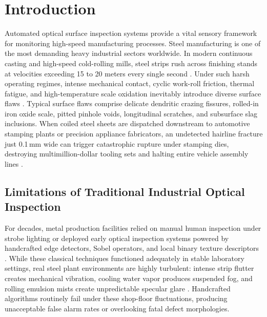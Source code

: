 \documentclass{ieeeaccess}
\begin{document}
\titlepgskip=-15pt

\maketitle

\section{Introduction}
\label{sec:introduction}
Automated optical surface inspection systems provide a vital sensory framework for monitoring high-speed manufacturing processes. Steel manufacturing is one of the most demanding heavy industrial sectors worldwide. In modern continuous casting and high-speed cold-rolling mills, steel strips rush across finishing stands at velocities exceeding 15 to 20 meters every single second \cite{survey2020}. Under such harsh operating regimes, intense mechanical contact, cyclic work-roll friction, thermal fatigue, and high-temperature scale oxidation inevitably introduce diverse surface flaws \cite{song2013neu}. Typical surface flaws comprise delicate dendritic crazing fissures, rolled-in iron oxide scale, pitted pinhole voids, longitudinal scratches, and subsurface slag inclusions. When coiled steel sheets are dispatched downstream to automotive stamping plants or precision appliance fabricators, an undetected hairline fracture just 0.1\,mm wide can trigger catastrophic rupture under stamping dies, destroying multimillion-dollar tooling sets and halting entire vehicle assembly lines \cite{survey2020, mao2025csdd}.

\subsection{Limitations of Traditional Industrial Optical Inspection}
\label{sec:intro_limitations}
For decades, metal production facilities relied on manual human inspection under strobe lighting or deployed early optical inspection systems powered by handcrafted edge detectors, Sobel operators, and local binary texture descriptors \cite{survey2020}. While these classical techniques functioned adequately in stable laboratory settings, real steel plant environments are highly turbulent: intense strip flutter creates mechanical vibration, cooling water vapor produces suspended fog, and rolling emulsion mists create unpredictable specular glare \cite{krassnig2025ispad}. Handcrafted algorithms routinely fail under these shop-floor fluctuations, producing unacceptable false alarm rates or overlooking fatal defect morphologies.
\end{document}
